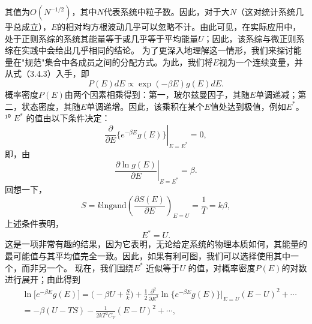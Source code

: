 其值为\(O(N^{-1/2})\)，其中\(N\)代表系统中粒子数。因此，对于大\(N\)（这对统计系统几乎总成立），\(E\)的相对均方根波动几乎可以忽略不计。由此可见，在实际应用中，处于正则系综的系统其能量等于或几乎等于平均能量\(U\)；因此，该系综与微正则系综在实践中会给出几乎相同的结论。
为了更深入地理解这一情形，我们来探讨能量在"规范"集合中各成员之间的分配方式。为此，我们将\(E\)视为一个连续变量，并从式（3.4.3）入手，即
\begin{equation}\tag{3.5.26}\label{eq:3.5.26}
P ( E ) d E \propto \exp ( - \beta E ) g ( E ) d E .
\end{equation}
概率密度\(P(E)\)由两个因素相乘得到：第一，玻尔兹曼因子，其随\(E\)单调递减；第二，状态密度，其随\(E\)单调递增。因此，该乘积在某个\(E\)值处达到极值，例如\(E^*\)。¹⁰ \(E^*\) 的值由以下条件决定：
\begin{equation}\tag{3.5.27}\label{eq:3.5.27}
\left. \frac { \partial } { \partial E } \{ e ^{- \beta E} g ( E ) \} \right| _ { E = E ^{*} } = 0 ,
\end{equation}
即，由
\begin{equation}\tag{3.5.28}\label{eq:3.5.28}
\left. \frac { \partial \ln g ( E ) } { \partial E } \right| _ { E = E ^{*} } = \beta .
\end{equation}
回想一下，
\begin{equation}\tag{3.5.29}\label{eq:3.5.29}
S = k \mathrm { l n g }  \mathrm { a n d }  \left( \frac { \partial S ( E ) } { \partial E } \right) _ { E = U } = \frac { 1 } { T } = k \beta ,
\end{equation}
上述条件表明，
\begin{equation}\tag{3.5.30}\label{eq:3.5.30}
E ^{*} = U .
\end{equation}
这是一项非常有趣的结果，因为它表明，无论给定系统的物理本质如何，其能量的最可能值与其平均值完全一致。因此，如果有利可图，我们可以选择使用其中一个，而非另一个。
现在，我们围绕\(E^*\) 近似等于\(U\) 的值，对概率密度\(P(E)\)的对数进行展开；由此得到
\begin{equation}\tag{3.5.31}\label{eq:3.5.31}
\begin{array}{rl} & { \ln \Big [ e ^{- \beta E} g ( E ) \Big ] = \Big ( - \beta U + \frac { S } { k } \Big ) + \frac { 1 } { 2 } \frac { \partial ^{2} } { \partial E ^{2} } \ln \Big \{ e ^{- \beta E} g ( E ) \Big \} \Bigg | _ { E = U } ( E - U ) ^{2} + \cdots } \\& {  = - \beta ( U - T S ) - \frac { 1 } { 2 k T ^{2} C _ { V } } ( E - U ) ^{2} + \cdots , } \end{array}
\end{equation}
